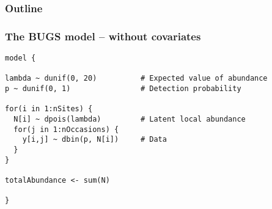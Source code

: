 \documentclass[color=usenames,dvipsnames]{beamer}\usepackage[]{graphicx}\usepackage[]{xcolor}
\makeatletter
\newenvironment{kframe}{%
 \def\at@end@of@kframe{}%
 \ifinner\ifhmode%
  \def\at@end@of@kframe{\end{minipage}}%
  \begin{minipage}{\columnwidth}%
 \fi\fi%
 \def\FrameCommand##1{\hskip\@totalleftmargin \hskip-\fboxsep
 \colorbox{shadecolor}{##1}\hskip-\fboxsep
     \hskip-\linewidth \hskip-\@totalleftmargin \hskip\columnwidth}%
 \MakeFramed {\advance\hsize-\width
   \@totalleftmargin\z@ \linewidth\hsize
   \@setminipage}}%
 {\par\unskip\endMakeFramed%
 \at@end@of@kframe}
\newenvironment{knitrout}{}{} %
\makeatother
\begin{document}
\begin{frame}[plain]
  \frametitle{Outline}
  \Large
\end{frame}





\begin{frame}[fragile]
  \frametitle{The BUGS model -- without covariates}
\begin{knitrout}\scriptsize
{}\color{fgcolor}\begin{kframe}
\begin{verbatim}
model {

lambda ~ dunif(0, 20)          # Expected value of abundance
p ~ dunif(0, 1)                # Detection probability

for(i in 1:nSites) {
  N[i] ~ dpois(lambda)         # Latent local abundance
  for(j in 1:nOccasions) {
    y[i,j] ~ dbin(p, N[i])     # Data
  }
}

totalAbundance <- sum(N)

}
\end{verbatim}
\end{kframe}
\end{knitrout}

\end{frame}
\end{document}
